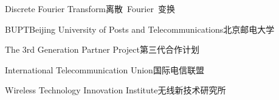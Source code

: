 % 


{Discrete Fourier Transform}{离散~Fourier~变换}

{BUPT}{Beijing University of Posts and Telecommunications}{北京邮电大学}

{The 3rd Generation Partner Project}{第三代合作计划}

{International Telecommunication Union}{国际电信联盟}

{Wireless Technology Innovation Institute}{无线新技术研究所}

